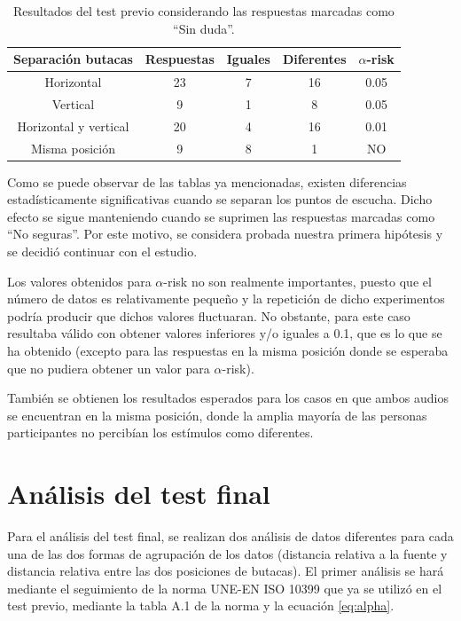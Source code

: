\documentclass[11pt,a4paper,twoside]{book}
\begin{document}
		\begin{table}
			\begin{center}
			\begin{scriptsize}
			\begin{tabular}{| c | c | c | c || c |}
			    \hline
				\textbf{Separación butacas}&\textbf{Respuestas}&\textbf{Iguales}&\textbf{Diferentes}&\textbf{$\alpha$-risk}\\ \hline
                Horizontal&23&7&16&0.05\\ \hline
                Vertical&9&1&8&0.05\\ \hline
                Horizontal y vertical&20&4&16&0.01\\ \hline
                Misma posición&9&8&1&NO\\ \hline
			\end{tabular}
			\caption{Resultados del test previo considerando las respuestas marcadas como ``Sin duda''.}
			\label{tablaResultadosSinDuda}
			\end{scriptsize}
			\end{center}	
		\end{table}
		
		Como se puede observar de las tablas ya mencionadas, existen diferencias estadísticamente significativas cuando se separan los puntos de escucha. Dicho efecto se sigue manteniendo cuando se suprimen las respuestas marcadas como ``No seguras''. Por este motivo, se considera probada nuestra primera hipótesis y se decidió continuar con el estudio.
		
		Los valores obtenidos para $\alpha$-risk no son realmente importantes, puesto que el número de datos es relativamente pequeño y la repetición de dicho experimentos podría producir que dichos valores fluctuaran. No obstante, para este caso resultaba válido con obtener valores inferiores y/o iguales a 0.1, que es lo que se ha obtenido (excepto para las respuestas en la misma posición donde se esperaba que no pudiera obtener un valor para $\alpha$-risk).
		
		También se obtienen los resultados esperados para los casos en que ambos audios se encuentran en la misma posición, donde la amplia mayoría de las personas participantes no percibían los estímulos como diferentes.
		
    \section{Análisis del test final}
        Para el análisis del test final, se realizan dos análisis de datos diferentes para cada una de las dos formas de agrupación de los datos (distancia relativa a la fuente y distancia relativa entre las dos posiciones de butacas). El primer análisis se hará mediante el seguimiento de la norma UNE-EN ISO 10399 que ya se utilizó en el test previo, mediante la tabla A.1 de la norma y la ecuación \ref{eq:alpha}.
        
\end{document}
